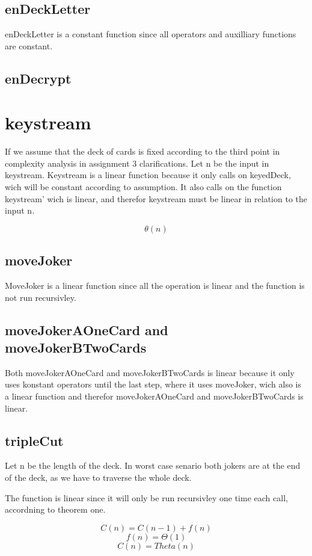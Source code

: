 \documentclass[12pt, a4paper]{article}
\begin{document}
\subsection{enDeckLetter}
enDeckLetter is a constant function since all operators and auxilliary functions are constant.

\subsection{enDecrypt}



\section{keystream}
If we assume that the deck of cards is fixed according to the third point in complexity analysis in assignment 3 clarifications. Let n be the input in keystream.
Keystream is a linear function because it only calls on keyedDeck, wich will be constant according to assumption. It also calls on the function keystream' wich is linear, and therefor keystream must be linear in relation to the input n.

$$ \theta(n)$$

\subsection{moveJoker}
MoveJoker is a linear function since all the operation is linear and the function is not run recursivley.

\subsection{moveJokerAOneCard and moveJokerBTwoCards}
Both moveJokerAOneCard and moveJokerBTwoCards is linear because it only uses konstant operators until the last step, where it uses moveJoker, wich also is a linear function and therefor moveJokerAOneCard and moveJokerBTwoCards is linear.

\subsection{tripleCut}
Let n be the length of the deck. In worst case senario both jokers are at the end of the deck, as we have to traverse the whole deck.

The function is linear since it will only be run recursivley one time each call, accordning to theorem one.

$$C(n) = C(n-1) + f(n)$$
$$f(n) = \Theta(1)$$
$$ C(n) = Theta(n)$$
\end{document}
